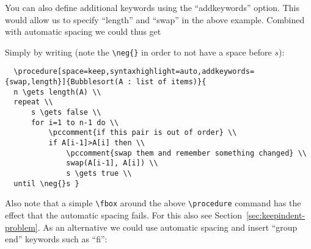 \documentclass[a4paper]{report}
\begin{document}
  You can also define additional keywords using the \enquote{addkeywords} option. This would allow us to specify \enquote{length} and \enquote{swap} in the above example. Combined with automatic spacing we could thus get
  \begin{center}
  \end{center}
  Simply by writing (note the \lstinline$\neg{}$ in order to not have a space before $s$):
  \begin{lstlisting}
  \procedure[space=keep,syntaxhighlight=auto,addkeywords={swap,length}]{Bubblesort(A : list of items)}{
  n \gets length(A) \\
  repeat \\
	  s \gets false \\
	  for i=1 to n-1 do \\
		  \pccomment{if this pair is out of order} \\
		  if A[i-1]>A[i] then \\
			  \pccomment{swap them and remember something changed} \\
			  swap(A[i-1], A[i]) \\
			  s \gets true \\
  until \neg{}s }
  \end{lstlisting}
  Also note that a simple \lstinline$\fbox$ around the above \lstinline$\procedure$ command has the effect that the automatic spacing fails. 
  For this also see Section~\ref{sec:keepindent-problem}. As an alternative we could use automatic spacing and insert \enquote{group end}
  keywords such as \enquote{fi}:
  \begin{center}
  \end{center}
\end{document}

